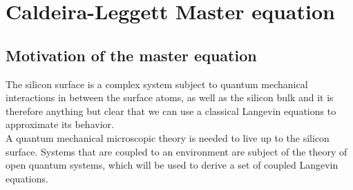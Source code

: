 	\section{Caldeira-Leggett Master equation}
		\subsection{Motivation of the master equation}
		The silicon surface is a complex system subject to quantum mechanical interactions in between the surface atoms, as well as the silicon bulk and it is therefore anything but clear that we can use a classical Langevin equations to approximate its behavior.\\
		
		A quantum mechanical microscopic theory is needed to live up to the silicon surface. Systems that are coupled to an environment are subject of the theory of open quantum systems, which will be used to derive a set of coupled Langevin equations. \\
		
